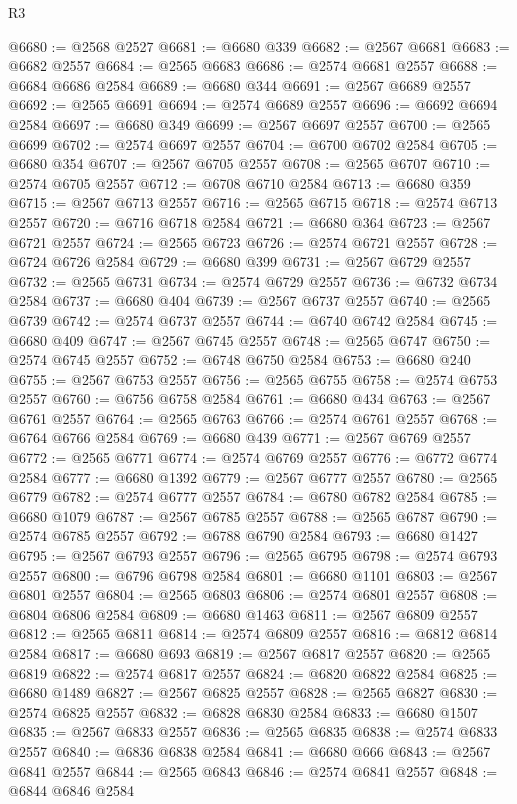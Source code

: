 \begin{lexlean}{R3}
\begin{coremodule}
@6680 := @2568 @2527
@6681 := @6680 @339
@6682 := @2567 @6681
@6683 := @6682 @2557
@6684 := @2565 @6683
@6686 := @2574 @6681 @2557
@6688 := @6684 @6686 @2584
@6689 := @6680 @344
@6691 := @2567 @6689 @2557
@6692 := @2565 @6691
@6694 := @2574 @6689 @2557
@6696 := @6692 @6694 @2584
@6697 := @6680 @349
@6699 := @2567 @6697 @2557
@6700 := @2565 @6699
@6702 := @2574 @6697 @2557
@6704 := @6700 @6702 @2584
@6705 := @6680 @354
@6707 := @2567 @6705 @2557
@6708 := @2565 @6707
@6710 := @2574 @6705 @2557
@6712 := @6708 @6710 @2584
@6713 := @6680 @359
@6715 := @2567 @6713 @2557
@6716 := @2565 @6715
@6718 := @2574 @6713 @2557
@6720 := @6716 @6718 @2584
@6721 := @6680 @364
@6723 := @2567 @6721 @2557
@6724 := @2565 @6723
@6726 := @2574 @6721 @2557
@6728 := @6724 @6726 @2584
@6729 := @6680 @399
@6731 := @2567 @6729 @2557
@6732 := @2565 @6731
@6734 := @2574 @6729 @2557
@6736 := @6732 @6734 @2584
@6737 := @6680 @404
@6739 := @2567 @6737 @2557
@6740 := @2565 @6739
@6742 := @2574 @6737 @2557
@6744 := @6740 @6742 @2584
@6745 := @6680 @409
@6747 := @2567 @6745 @2557
@6748 := @2565 @6747
@6750 := @2574 @6745 @2557
@6752 := @6748 @6750 @2584
@6753 := @6680 @240
@6755 := @2567 @6753 @2557
@6756 := @2565 @6755
@6758 := @2574 @6753 @2557
@6760 := @6756 @6758 @2584
@6761 := @6680 @434
@6763 := @2567 @6761 @2557
@6764 := @2565 @6763
@6766 := @2574 @6761 @2557
@6768 := @6764 @6766 @2584
@6769 := @6680 @439
@6771 := @2567 @6769 @2557
@6772 := @2565 @6771
@6774 := @2574 @6769 @2557
@6776 := @6772 @6774 @2584
@6777 := @6680 @1392
@6779 := @2567 @6777 @2557
@6780 := @2565 @6779
@6782 := @2574 @6777 @2557
@6784 := @6780 @6782 @2584
@6785 := @6680 @1079
@6787 := @2567 @6785 @2557
@6788 := @2565 @6787
@6790 := @2574 @6785 @2557
@6792 := @6788 @6790 @2584
@6793 := @6680 @1427
@6795 := @2567 @6793 @2557
@6796 := @2565 @6795
@6798 := @2574 @6793 @2557
@6800 := @6796 @6798 @2584
@6801 := @6680 @1101
@6803 := @2567 @6801 @2557
@6804 := @2565 @6803
@6806 := @2574 @6801 @2557
@6808 := @6804 @6806 @2584
@6809 := @6680 @1463
@6811 := @2567 @6809 @2557
@6812 := @2565 @6811
@6814 := @2574 @6809 @2557
@6816 := @6812 @6814 @2584
@6817 := @6680 @693
@6819 := @2567 @6817 @2557
@6820 := @2565 @6819
@6822 := @2574 @6817 @2557
@6824 := @6820 @6822 @2584
@6825 := @6680 @1489
@6827 := @2567 @6825 @2557
@6828 := @2565 @6827
@6830 := @2574 @6825 @2557
@6832 := @6828 @6830 @2584
@6833 := @6680 @1507
@6835 := @2567 @6833 @2557
@6836 := @2565 @6835
@6838 := @2574 @6833 @2557
@6840 := @6836 @6838 @2584
@6841 := @6680 @666
@6843 := @2567 @6841 @2557
@6844 := @2565 @6843
@6846 := @2574 @6841 @2557
@6848 := @6844 @6846 @2584

\end{coremodule}
\end{lexlean}
